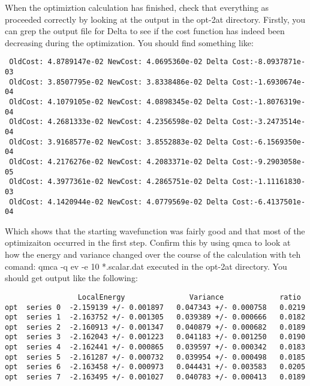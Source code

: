 When the optimiztion calculation has finished, check that everything as proceeded correctly by looking at the output in the opt-2at directory.  Firstly, you can grep the output file for Delta to see if the cost function has indeed been decreasing during the optimization.  You should find something like:
\begin{shaded}
\begin{verbatim}
 OldCost: 4.8789147e-02 NewCost: 4.0695360e-02 Delta Cost:-8.0937871e-03
 OldCost: 3.8507795e-02 NewCost: 3.8338486e-02 Delta Cost:-1.6930674e-04
 OldCost: 4.1079105e-02 NewCost: 4.0898345e-02 Delta Cost:-1.8076319e-04
 OldCost: 4.2681333e-02 NewCost: 4.2356598e-02 Delta Cost:-3.2473514e-04
 OldCost: 3.9168577e-02 NewCost: 3.8552883e-02 Delta Cost:-6.1569350e-04
 OldCost: 4.2176276e-02 NewCost: 4.2083371e-02 Delta Cost:-9.2903058e-05
 OldCost: 4.3977361e-02 NewCost: 4.2865751e-02 Delta Cost:-1.11161830-03
 OldCost: 4.1420944e-02 NewCost: 4.0779569e-02 Delta Cost:-6.4137501e-04
\end{verbatim}
\end{shaded}
Which shows that the starting wavefunction was fairly good and that most of the optimizaiton occurred in the first step.  Confirm this by using qmca to look at how the energy and variance changed over the course of the calculation with teh comand: qmca -q ev -e 10 *.scalar.dat executed in the opt-2at directory.  You should get output like the following:
\begin{shaded}
\begin{verbatim}
                 LocalEnergy               Variance             ratio
opt  series 0  -2.159139 +/- 0.001897   0.047343 +/- 0.000758   0.0219 
opt  series 1  -2.163752 +/- 0.001305   0.039389 +/- 0.000666   0.0182 
opt  series 2  -2.160913 +/- 0.001347   0.040879 +/- 0.000682   0.0189 
opt  series 3  -2.162043 +/- 0.001223   0.041183 +/- 0.001250   0.0190 
opt  series 4  -2.162441 +/- 0.000865   0.039597 +/- 0.000342   0.0183 
opt  series 5  -2.161287 +/- 0.000732   0.039954 +/- 0.000498   0.0185 
opt  series 6  -2.163458 +/- 0.000973   0.044431 +/- 0.003583   0.0205 
opt  series 7  -2.163495 +/- 0.001027   0.040783 +/- 0.000413   0.0189 
\end{verbatim}
\end{shaded}

